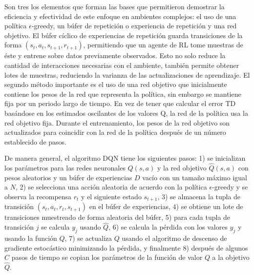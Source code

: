 Son tres los elementos que forman las bases que permitieron demostrar
la eficiencia y efectividad de este enfoque en ambientes complejos: el uso de una política $\epsilon$-greedy, un búfer de repetición o experiencia de repetición \cite{lin1993reinforcement} y una red objetivo.
El búfer cíclico de experiencias de repetición guarda transiciones de la forma 
$(s_t, a_t, s_{t+1}, r_{t+1})$, permitiendo que un agente de RL 
tome muestras de éste y entrene sobre datos previamente observados. 
Esto no solo reduce la cantidad de interacciones necesarias con el ambiente,
también permite obtener lotes de muestras, reduciendo la varianza de 
las actualizaciones de aprendizaje. 
El segundo método importante es el uso de una red objetivo que inicialmente contiene los pesos de la red que representa la política, sin embargo se mantiene
fija por un periodo largo de tiempo.
En vez de tener que calcular el error TD basándose en los estimados
oscilantes de los valores Q, la red de la política usa la red objetivo fija.
Durante el entrenamiento, los pesos de la red objetivo son actualizados 
para coincidir con la red de la política después de un número establecido de pasos.

De manera general, el algoritmo DQN tiene los siguientes pasos: 1) se inicializan los parámetros para las redes neuronales $Q(s, a)$ y la red objetivo $\hat{Q}(s, a)$ con pesos aleatorios y 
un búfer de experiencias $D$ vacío con un tamaño máximo igual a $N$, 2) se selecciona
una acción aleatoria de acuerdo con la política $\epsilon$-greedy y se observa
la recompensa $r_t$ y el siguiente estado $s_{t+1}$, 3) se almacena la tupla
de transición $(s_t, a_t, r_t, s_{t+1})$ en el búfer de experiencias, 4)
se obtiene un lote de transiciones muestreado de forma aleatoria del búfer, 5)
para cada tupla de transición $j$ se calcula $y_j$ usando $\hat{Q}$, 6) se calcula la pérdida con los
valores $y_j$ y usando la función $Q$, 7) se actualiza $Q$ usando el algoritmo de descenso
de gradiente estocástico minimizando la pérdida, y finalmente 8) después de algunos $C$
pasos de tiempo se copian los parámetros de la función de valor $Q$ a la objetivo $\hat{Q}$.

